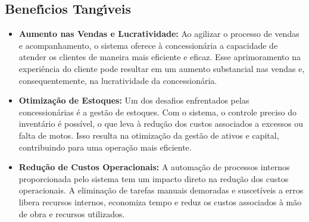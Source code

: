        \subsection{Benef\'{\i}cios Tang\'{\i}veis}
		\begin{itemize}
			\item \textbf{Aumento nas Vendas e Lucratividade:} Ao agilizar o processo de vendas e acompanhamento, o sistema oferece à concessionária a capacidade de atender os clientes de maneira mais eficiente e eficaz. Esse aprimoramento na experiência do cliente pode resultar em um aumento substancial nas vendas e, consequentemente, na lucratividade da concessionária.
			
			\item \textbf{Otimização de Estoques:} Um dos desafios enfrentados pelas concessionárias é a gestão de estoques. Com o sistema, o controle preciso do inventário é possível, o que leva à redução dos custos associados a excessos ou falta de motos. Isso resulta na otimização da gestão de ativos e capital, contribuindo para uma operação mais eficiente.
			
			\item \textbf{Redução de Custos Operacionais:} A automação de processos internos proporcionada pelo sistema tem um impacto direto na redução dos custos operacionais. A eliminação de tarefas manuais demoradas e suscetíveis a erros libera recursos internos, economiza tempo e reduz os custos associados à mão de obra e recursos utilizados.
			
		\end{itemize}

